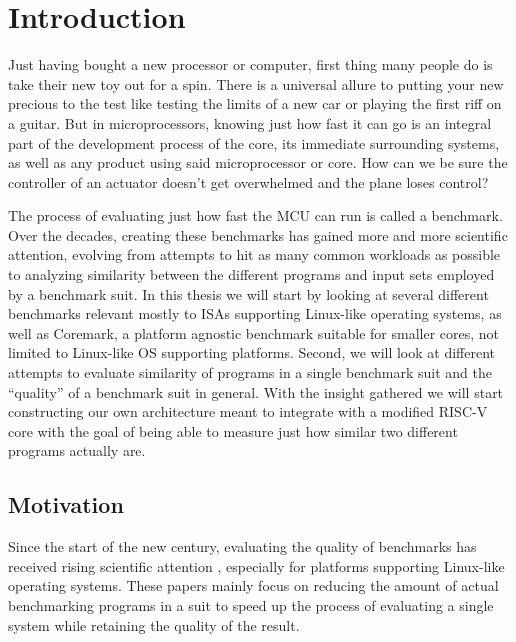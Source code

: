 \documentclass[../bachelor_paper.tex]{subfiles}
\begin{document}
\chapter{Introduction}
    \label{ch:intro}

Just having bought a new processor or computer, first thing many people do is take their new toy out for a spin. There is a universal allure to putting your new precious to the test like testing the limits of a new car or playing the first riff on a guitar. But in microprocessors, knowing just how fast it can go is an integral part of the development process of the core, its immediate surrounding systems, as well as any product using said microprocessor or core. How can we be sure the controller of an actuator doesn't get overwhelmed and the plane loses control?

The process of evaluating just how fast the \ac{MCU} can run is called a benchmark. Over the decades, creating these benchmarks has gained more and more scientific attention, evolving from attempts to hit as many common workloads as possible to analyzing similarity between the different programs and input sets employed by a benchmark suit. In this thesis we will start by looking at several different benchmarks relevant mostly to \ac{ISA}s supporting Linux-like operating systems, as well as Coremark\cite{gal-onExploringCoremarkBenchmark2012}, a platform agnostic benchmark suitable for smaller cores, not limited to Linux-like \ac{OS} supporting platforms. Second, we will look at different attempts to evaluate similarity of programs in a single benchmark suit and the ``quality'' of a benchmark suit in general. With the insight gathered we will start constructing our own architecture meant to integrate with a modified RISC-V core with the goal of being able to measure just how similar two different programs actually are.

\section{Motivation}
Since the start of the new century, evaluating the quality of benchmarks has received rising scientific attention \cite{eeckhoutDesigningComputerArchitecture2003,dujmovicEvolutionEvaluationSPEC1998,vandierendonckManyBenchmarksStress,phansalkarMeasuringProgramSimilarity2005,eeckhoutQuantifyingImpactInput}, especially for platforms supporting Linux-like operating systems. These papers mainly focus on reducing the amount of actual benchmarking programs in a suit to speed up the process of evaluating a single system while retaining the quality of the result. 
\end{document}

